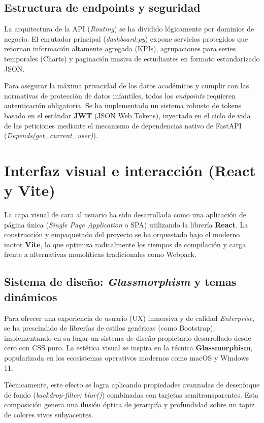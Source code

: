 \subsection{Estructura de endpoints y seguridad}

La arquitectura de la API (\textit{Routing}) se ha dividido lógicamente por dominios de negocio. El enrutador principal (\textit{dashboard.py}) expone servicios protegidos que retornan información altamente agregada (KPIs), agrupaciones para series temporales (Charts) y paginación masiva de estudiantes en formato estandarizado JSON.

Para asegurar la máxima privacidad de los datos académicos y cumplir con las normativas de protección de datos infantiles, todos los \textit{endpoints} requieren autenticación obligatoria. Se ha implementado un sistema robusto de tokens basado en el estándar \textbf{JWT} (JSON Web Tokens), inyectado en el ciclo de vida de las peticiones mediante el mecanismo de dependencias nativo de FastAPI (\textit{Depends(get\_current\_user)}).

\section{Interfaz visual e interacción (React y Vite)}

La capa visual de cara al usuario ha sido desarrollada como una aplicación de página única (\textit{Single Page Application} o SPA) utilizando la librería \textbf{React}. La construcción y empaquetado del proyecto se ha orquestado bajo el moderno motor \textbf{Vite}, lo que optimiza radicalmente los tiempos de compilación y carga frente a alternativas monolíticas tradicionales como Webpack.

\subsection{Sistema de diseño: \textit{Glassmorphism} y temas dinámicos}

Para ofrecer una experiencia de usuario (UX) inmersiva y de calidad \textit{Enterprise}, se ha prescindido de librerías de estilos genéricas (como Bootstrap), implementando en su lugar un sistema de diseño propietario desarrollado desde cero con CSS puro. La estética visual se inspira en la técnica \textbf{Glassmorphism}, popularizada en los ecosistemas operativos modernos como macOS y Windows 11.

Técnicamente, este efecto se logra aplicando propiedades avanzadas de desenfoque de fondo (\textit{backdrop-filter: blur()}) combinadas con tarjetas semitransparentes. Esta composición genera una ilusión óptica de jerarquía y profundidad sobre un tapiz de colores vivos subyacentes. 


